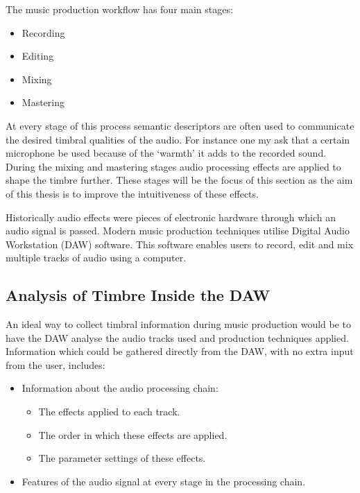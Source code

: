 		The music production workflow has four main stages:

		\begin{itemize}
			\item Recording
			\item Editing
			\item Mixing
			\item Mastering
		\end{itemize}

		At every stage of this process semantic descriptors are often used to communicate the desired timbral
		qualities of the audio. For instance one my ask that a certain microphone be used because of the `warmth' it
		adds to the recorded sound. During the mixing and mastering stages audio processing effects are applied to
		shape the timbre further.  These stages will be the focus of this section as the aim of this thesis is to
		improve the intuitiveness of these effects.

		Historically audio effects were pieces of electronic hardware through which an audio signal is passed.
		Modern music production techniques utilise Digital Audio Workstation (DAW) software. This software enables
		users to record, edit and mix multiple tracks of audio using a computer. 
		
	\subsection{Analysis of Timbre Inside the DAW}
	\label{sec:TimbreEvaluation-DAWBasedTimbreEvaluation-InDAW}
		An ideal way to collect timbral information during music production would be to have the DAW analyse the
		audio tracks used and production techniques applied. Information which could be gathered directly from the
		DAW, with no extra input from the user, includes:

		\begin{itemize}
			\item Information about the audio processing chain:
			\begin{itemize}
				\item The effects applied to each track.
				\item The order in which these effects are applied.
				\item The parameter settings of these effects.
			\end{itemize}

			\item Features of the audio signal at every stage in the processing chain.
		\end{itemize}

